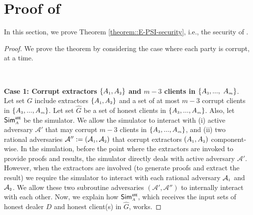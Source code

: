 

\section{Proof of \epsi}\label{sec::E-PSI-proof}



In this section, we prove Theorem \ref{theorem::E-PSI-security}, i.e., the security of \epsi. 


\begin{proof}
%
We prove the theorem by considering the case where each party is corrupt, at a time.




\

\noindent\textbf{Case 1: Corrupt extractors $\{A_{\scriptscriptstyle 1}, A_{\scriptscriptstyle 2}\}$ and $m-3$ clients in $\{  {  A}_{ \scriptscriptstyle {   3}}, ...,$ $   {  A}_{ \scriptscriptstyle {   m}}\}$}.  Let set $G$ include extractors $\{A_{\scriptscriptstyle 1}, A_{\scriptscriptstyle 2}\}$ and a set of at most $m-3$ corrupt clients in $\{  {  A}_{ \scriptscriptstyle {   3}}, ...,   {  A}_{ \scriptscriptstyle {   m}}\}$. Let set $\hat G$ be a set of honest clients in  $\{  {  A}_{ \scriptscriptstyle {   3}}, ...,   {  A}_{ \scriptscriptstyle {   m}}\}$. Also, let $\mathsf{Sim}^{\scriptscriptstyle\mathtt{ANE}}_{\scriptscriptstyle A}$ be the simulator. We allow the simulator to interact with (i) active adversary  $\mathcal{A}'$ that may corrupt $m-3$ clients in $\{  {  A}_{ \scriptscriptstyle {   3}}, ...,   {  A}_{ \scriptscriptstyle {   m}}\}$, and (ii) two rational adversaries  $\mathcal{A}'':=(\mathcal{A}_{\scriptscriptstyle 1}, \mathcal{A}_{\scriptscriptstyle 2})$ that corrupt extractors $(A_{\scriptscriptstyle 1},A_{\scriptscriptstyle 2})$ component-wise.  
%
%
In the simulation, before the point where the extractors are invoked to provide proofs and results, the simulator directly deals with active adversary  $\mathcal{A}'$. However, when the extractors are involved (to generate proofs and extract the result) we require the simulator to interact with each rational adversary $\mathcal{A}_{\scriptscriptstyle 1}$ and $\mathcal{A}_{\scriptscriptstyle 2}$.  We allow these two subroutine adversaries $(\mathcal{A}', \mathcal{A}'')$  to internally interact with each other.  Now, we explain how $\mathsf{Sim}^{\scriptscriptstyle \mathtt{ANE}}_{\scriptscriptstyle A}$, which receives the input sets of honest dealer $D$ and honest client(s) in $\hat G$,  works. 




\end{proof}
